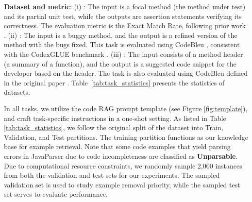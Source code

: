 \noindent\textbf{Dataset and metric}:  (i) \textbf{\taskone}: The input is a focal method (the method under test) and its partial unit test, while the outputs are assertion statements verifying its correctness. The evaluation metric is the Exact Match Rate, following prior work \citep{UBC}. (ii)\textbf{ \tasktwo}: The input is a buggy method, and the output is a refined version of the method with the bugs fixed. This task is evaluated using CodeBleu \citep{codebleu}, consistent with the CodexGLUE benchmark \citep{codexglue}. (iii) \textbf{\taskthree}: The input consists of a method header (a summary of a function), and the output is a suggested code snippet for the developer based on the header. The task is also evaluated using CodeBleu defined in the original paper \citep{allyouneed}. Table~\ref{tab:task_statistics} presents the statistics of datasets.

\begin{table}[ht]
    \centering
    \caption{Dataset statistics of different coding tasks.}
    \label{tab:task_statistics}
\end{table}

In all tasks, we utilize the code RAG prompt template \citep{allyouneed,he2024,UBC} (see Figure \ref{fig:template}), and craft task-specific instructions in a one-shot setting. As listed in Table \ref{tab:task_statistics}, we follow the original split of the dataset into Train, Validation, and Test partitions. The training partition functions as our knowledge base for example retrieval. Note that some code examples that yield parsing errors in JavaParser due to code incompleteness are classified as \textbf{Unparsable}. 
Due to computational resource constraints, we randomly sample 2,000 instances from both the validation and test sets for our experiments. The sampled validation set is used to study example removal priority, while the sampled test set serves to evaluate performance.


